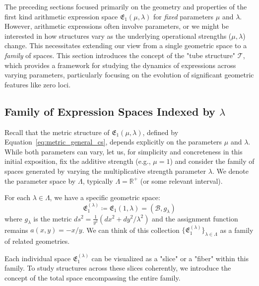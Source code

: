 \documentclass[12pt]{article}
\begin{document}
The preceding sections focused primarily on the geometry and properties of the first kind arithmetic expression space \( \mathfrak{E}_1(\mu, \lambda) \) for \emph{fixed} parameters \( \mu \) and \( \lambda \). However, arithmetic expressions often involve parameters, or we might be interested in how structures vary as the underlying operational strengths (\( \mu, \lambda \)) change. This necessitates extending our view from a single geometric space to a \emph{family} of spaces. This section introduces the concept of the "tube structure" \( \mathcal{T} \), which provides a framework for studying the dynamics of expressions across varying parameters, particularly focusing on the evolution of significant geometric features like zero loci.

\subsection{Family of Expression Spaces Indexed by \( \lambda \)} %

Recall that the metric structure of \( \mathfrak{E}_1(\mu, \lambda) \), defined by Equation~\eqref{eq:metric_general_cs}, depends explicitly on the parameters \( \mu \) and \( \lambda \). While both parameters can vary, let us, for simplicity and concreteness in this initial exposition, fix the additive strength (e.g., \( \mu = 1 \)) and consider the family of spaces generated by varying the multiplicative strength parameter \( \lambda \). We denote the parameter space by \( \Lambda \), typically \( \Lambda = \mathbb{R}^+ \) (or some relevant interval).

For each \( \lambda \in \Lambda \), we have a specific geometric space:
\[
\mathfrak{E}_1^{(\lambda)} \coloneqq \mathfrak{E}_1(1, \lambda) = (\mathcal{B}, g_\lambda)
\]
where \( g_\lambda \) is the metric \( ds^2 = \frac{1}{y^2}(dx^2 + dy^2/\lambda^2) \) and the assignment function remains \( a(x,y) = -x/y \). We can think of this collection \( \{ \mathfrak{E}_1^{(\lambda)} \}_{\lambda \in \Lambda} \) as a family of related geometries.

Each individual space \( \mathfrak{E}_1^{(\lambda)} \) can be visualized as a "slice" or a "fiber" within this family. To study structures across these slices coherently, we introduce the concept of the total space encompassing the entire family.
\end{document}
